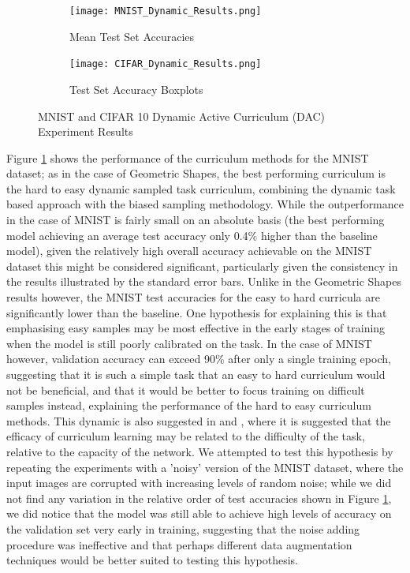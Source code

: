 \begin{figure}[h!]
\hspace*{-3cm}    
\centering
\begin{subfigure}{0.7\textwidth}
  \centering
  \texttt{[image: MNIST\_Dynamic\_Results.png]}
  \caption{ Mean Test Set Accuracies}
  \label{fig:DAC_ste_MNIST}
\end{subfigure}%
\begin{subfigure}{0.7\textwidth}
\hspace*{-1cm}   
  \centering
  \texttt{[image: CIFAR\_Dynamic\_Results.png]}
  \caption{Test Set Accuracy Boxplots}
  \label{fig:DAC_ste_CIFAR}
\end{subfigure}
\caption{MNIST and CIFAR 10 Dynamic Active Curriculum (DAC) Experiment Results}
\label{fig:DACResults}
\end{figure}


Figure \ref{fig:DAC_ste_MNIST} shows the performance of the curriculum methods for the MNIST dataset; as in the case of Geometric Shapes, the best performing curriculum is the hard to easy dynamic sampled task curriculum, combining the dynamic task based approach with the biased sampling methodology. While the outperformance in the case of MNIST is fairly small on an absolute basis (the best performing model achieving an average test accuracy only 0.4\% higher than the baseline model), given the relatively high overall accuracy achievable on the MNIST dataset this might be considered significant, particularly given the consistency in the results illustrated by the standard error bars. Unlike in the Geometric Shapes results however, the MNIST test accuracies for the easy to hard curricula are significantly lower than the baseline. One hypothesis for explaining this is that emphasising easy samples may be most effective in the early stages of training when the model is still poorly calibrated on the task. In the case of MNIST however, validation accuracy can exceed 90\% after only a single training epoch, suggesting that it is such a simple task that an easy to hard curriculum would not be beneficial, and that it would be better to focus training on difficult samples instead, explaining the performance of the hard to easy curriculum methods. This dynamic is also suggested in \cite{Chang18} and \cite{weinshall2018curriculum}, where it is suggested that the efficacy of curriculum learning may be related to the difficulty of the task, relative to the capacity of the network. We attempted to test this hypothesis by repeating the experiments with a 'noisy' version of the MNIST dataset, where the input images are corrupted with increasing levels of random noise; while we did not find any variation in the relative order of test accuracies shown in Figure \ref{fig:DAC_ste_MNIST}, we did notice that the model was still able to achieve high levels of accuracy on the validation set very early in training, suggesting that the noise adding procedure was ineffective and that perhaps different data augmentation techniques would be better suited to 
testing this hypothesis. 

